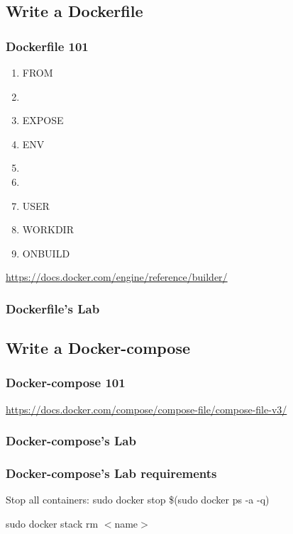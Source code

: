 \documentclass{beamer}
\begin{document}
\subsection{Write a Dockerfile}
\begin{frame}
    \frametitle{Dockerfile 101}
    \begin{multicols*}{2}
        \begin{enumerate}
            \item FROM
            \item {\color{red}{RUN, CMD, ENTRYPOINT}}
            \item EXPOSE
            \item ENV
            \item {\color{red}{ADD, COPY}}
            \item {\color{red}{VOLUME}}
            \item USER
            \item WORKDIR
            \item ONBUILD
        \end{enumerate}
    \end{multicols*}
    \url{https://docs.docker.com/engine/reference/builder/}
\end{frame}

\begin{frame}
    \frametitle{Dockerfile's Lab}
    
\end{frame}

\subsection{Write a Docker-compose}
\begin{frame}
    \frametitle{Docker-compose 101}
    
    \small\url{https://docs.docker.com/compose/compose-file/compose-file-v3/}
\end{frame}

\begin{frame}
    \frametitle{Docker-compose's Lab}
    
\end{frame}

\begin{frame}
    \frametitle{Docker-compose's Lab requirements}
    

    \begin{block}{Stop all containers:}
        sudo docker stop \$(sudo docker ps -a -q)

        sudo docker stack rm $<$name$>$
    \end{block}
\end{frame}
\end{document}
